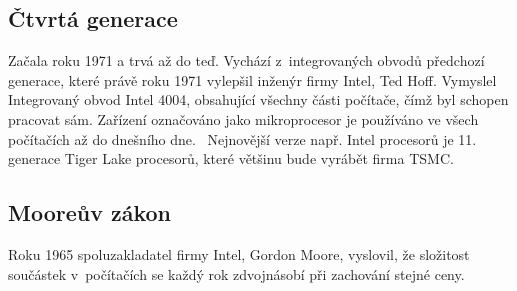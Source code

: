 \documentclass[11pt]{article}
\begin{document}
\subsection{Čtvrtá generace}
Začala roku 1971 a trvá až do teď. Vychází z~integrovaných obvodů předchozí generace, které právě roku 1971 vylepšil inženýr firmy Intel, Ted Hoff. Vymyslel Integrovaný obvod Intel 4004, obsahující všechny části počítače, čímž byl schopen pracovat sám. Zařízení označováno jako mikroprocesor je používáno ve všech počítačích až do dnešního dne.~\cite{janostikBach} Nejnovější verze např. Intel procesorů je 11. generace Tiger Lake procesorů, které většinu bude vyrábět firma TSMC.~\cite{articleChip}

\subsection{Mooreův zákon}
Roku 1965 spoluzakladatel firmy Intel, Gordon Moore, vyslovil, že složitost součástek v~počítačích se každý rok zdvojnásobí při zachování stejné ceny.~\cite{mooreLaw}

\newpage

\renewcommand{\refname}{citace}

\end{document}
